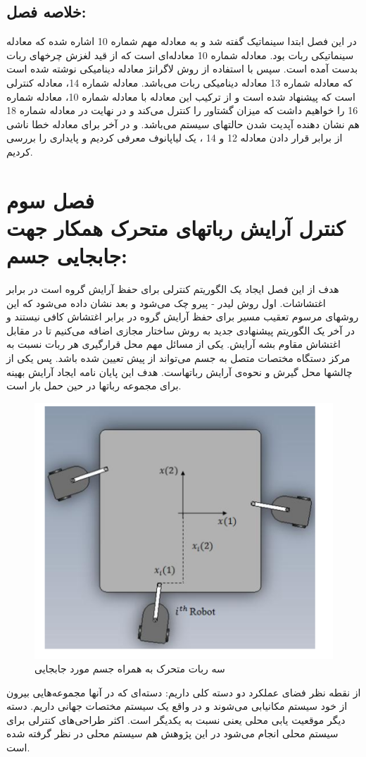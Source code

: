 \subsection{خلاصه فصل:}
در این فصل ابتدا سینماتیک گفته شد و به معادله مهم شماره 10 اشاره شده که معادله سینماتیکی ربات بود. معادله شماره 10 معادله‌ای است که از قید لغزش چرخهای ربات بدست آمده است. سپس با استفاده از روش لاگرانژ معادله دینامیکی نوشته شده است که معادله شماره 13 معادله دینامیکی ربات می‌باشد. معادله شماره 14، معادله کنترلی است که پیشنهاد شده است و از ترکیب این معادله با معادله شماره 10، معادله شماره 16 را خواهیم داشت که میزان گشتاور را کنترل می‌کند و در نهایت در معادله شماره 18 هم نشان دهنده آپدیت شدن حالتهای سیستم می‌باشد. و در آخر برای معادله خطا ناشی از برابر قرار دادن معادله 12 و 14 ، یک لیاپانوف معرفی کردیم و پایداری را بررسی کردیم.

\section{فصل سوم 
	\\
	کنترل آرایش رباتهای متحرک همکار جهت جابجایی جسم:
	}
هدف از این فصل ایجاد یک الگوریتم کنترلی برای حفظ آرایش گروه است در برابر اغتشاشات. اول روش لیدر - پیرو چک می‌شود و بعد نشان داده می‌شود که این روشهای مرسوم تعقیب مسیر برای حفظ آرایش گروه در برابر اغتشاش کافی نیستند و در آخر یک الگوریتم پیشنهادی جدید به روش ساختار مجازی اضافه می‌کنیم تا در مقابل اغتشاش مقاوم بشه آرایش.
یکی از مسائل مهم محل قرارگیری هر ربات نسبت به مرکز دستگاه مختصات متصل به جسم می‌تواند از پیش تعیین شده باشد.
پس یکی از چالشها محل گیرش و نحوه‌ی آرایش رباتهاست.
هدف این پایان نامه ایجاد آرایش بهینه برای مجموعه رباتها در حین حمل بار است.

\begin{figure}[h]
	\centering
	\includegraphics[width=0.7\linewidth]{images/3}
	\caption{سه ربات متحرک به همراه جسم مورد جابجایی}
	\label{fig:3}
\end{figure}
\noindent\unskip
از نقطه نظر فضای عملکرد دو دسته کلی داریم:
دسته‌ای که در آنها مجموعه‌‌هایی بیرون از خود سیستم مکانیابی می‌شوند و در واقع یک سیستم مختصات جهانی داریم.
دسته دیگر موقعیت یابی محلی یعنی نسبت به یکدیگر است.
اکثر طراحی‌های کنترلی برای سیستم محلی انجام می‌شود در این پژوهش هم سیستم محلی در نظر گرفته شده است.
